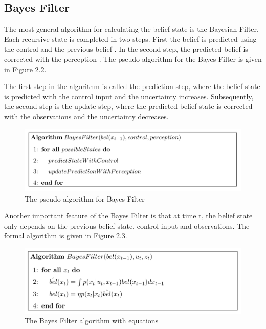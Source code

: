 \subsection{Bayes Filter}
The most general algorithm for calculating the belief state is the Bayesian Filter. Each recursive state is completed in two steps. First the belief  is predicted using the control  and the previous belief  . In the second step, the predicted belief is corrected with the perception  \cite{thrun2005}. The pseudo-algorithm for the Bayes Filter is given in Figure 2.2.

The first step in the algorithm is called the prediction step, where the belief state is predicted with the control input and the uncertainty increases. Subsequently, the second step is the update step, where the predicted belief state is corrected with the observations and the uncertainty decreases. 

\begin{figure}[!htbp]
\centering
\includegraphics[width=\textwidth]{thesisChapters/images/figure22.png}
\caption{The pseudo-algorithm for Bayes Filter}
\end{figure}

Another important feature of the Bayes Filter is that at time t, the belief state only depends on the previous belief state, control input and observations. The formal algorithm is given in Figure 2.3.

\begin{figure}[!htbp]
\centering
\includegraphics[width=\textwidth]{thesisChapters/images/figure23.png}
\caption{The Bayes Filter algorithm with equations}
\end{figure}



